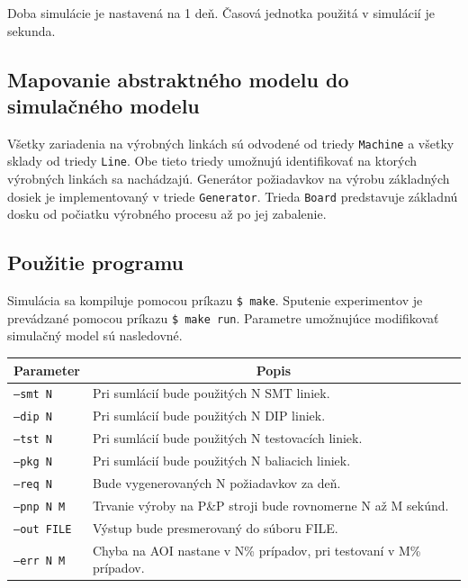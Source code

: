 \documentclass[12pt,a4paper,titlepage,final]{article}
\begin{document}
Doba simulácie je nastavená na 1 deň. Časová jednotka použitá v simulácií je 
sekunda.

\subsection{Mapovanie abstraktného modelu do simulačného modelu}
Všetky zariadenia na výrobných linkách sú odvodené od triedy \texttt{Machine}
a všetky sklady od triedy \texttt{Line}. Obe tieto triedy umožnujú identifikovať
na ktorých výrobných linkách sa nachádzajú. Generátor požiadavkov na výrobu základných
dosiek je implementovaný v triede \texttt{Generator}. Trieda \texttt{Board} predstavuje
základnú dosku od počiatku výrobného procesu až po jej zabalenie. 

\subsection{Použitie programu}
Simulácia sa kompiluje pomocou príkazu \texttt{\$ make}. Sputenie experimentov
je prevádzané pomocou príkazu \texttt{\$ make run}. Parametre umožnujúce modifikovať
simulačný model sú nasledovné.

\begin{table}[h]
\centering
\begin{tabular}{|l|l|}
\hline
\multicolumn{1}{|c|}{\textbf{Parameter}} & \multicolumn{1}{c|}{\textbf{Popis}}  \\ \hline
\texttt{--smt N}    & Pri sumlácií bude použitých N SMT liniek.                          \\ \hline
\texttt{--dip N}    & Pri sumlácií bude použitých N DIP liniek.                          \\ \hline
\texttt{--tst N}    & Pri sumlácií bude použitých N testovacích liniek.                  \\ \hline
\texttt{--pkg N}    & Pri sumlácií bude použitých N baliacich liniek.                    \\ \hline
\texttt{--req N}    & Bude vygenerovaných N požiadavkov za deň.                          \\ \hline
\texttt{--pnp N M}  & Trvanie výroby na P\&P stroji bude rovnomerne N až M sekúnd.       \\ \hline
\texttt{--out FILE} & Výstup bude presmerovaný do súboru FILE.                           \\ \hline
\texttt{--err N M}  & Chyba na AOI nastane v N\% prípadov, pri testovaní v M\% prípadov. \\ \hline
\end{tabular}
\end{table}
\end{document}

